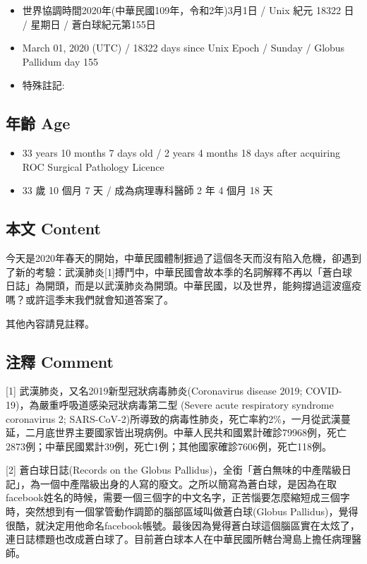 \documentclass[a5paper, 12pt
]{book}
\providecommand{\tightlist}{%
  \setlength{\itemsep}{0pt}\setlength{\parskip}{0pt}}
\begin{document}
\begin{itemize}
\tightlist
\item
  世界協調時間2020年(中華民國109年，令和2年)3月1日 / Unix 紀元 18322 日
  / 星期日 / 蒼白球紀元第155日
\item
  March 01, 2020 (UTC) / 18322 days since Unix Epoch / Sunday / Globus
  Pallidum day 155
\item
  特殊註記:
\end{itemize}

\hypertarget{ux5e74ux9f61-age}{%
\subsection{年齡 Age}\label{ux5e74ux9f61-age}}

\begin{itemize}
\tightlist
\item
  33 years 10 months 7 days old / 2 years 4 months 18 days after
  acquiring ROC Surgical Pathology Licence
\item
  33 歲 10 個月 7 天 / 成為病理專科醫師 2 年 4 個月 18 天
\end{itemize}

\hypertarget{ux672cux6587-content}{%
\subsection{本文 Content}\label{ux672cux6587-content}}

今天是2020年春天的開始，中華民國體制捱過了這個冬天而沒有陷入危機，卻遇到了新的考驗：武漢肺炎{[}1{]}搏鬥中，中華民國會故本季的名詞解釋不再以「蒼白球日誌」為開頭，而是以武漢肺炎為開頭。中華民國，以及世界，能夠撐過這波瘟疫嗎？或許這季末我們就會知道答案了。

其他內容請見註釋。

\hypertarget{ux6ce8ux91cb-comment}{%
\subsection{注釋 Comment}\label{ux6ce8ux91cb-comment}}

{[}1{]} 武漢肺炎，又名2019新型冠狀病毒肺炎(Coronavirus disease 2019;
COVID-19)，為嚴重呼吸道感染冠狀病毒第二型 (Severe acute respiratory
syndrome coronavirus 2;
SARS-CoV-2)所導致的病毒性肺炎，死亡率約2\%，一月從武漢蔓延，二月底世界主要國家皆出現病例。中華人民共和國累計確診79968例，死亡2873例；中華民國累計39例，死亡1例；其他國家確診7606例，死亡118例。

{[}2{]} 蒼白球日誌(Records on the Globus
Pallidus)，全銜「蒼白無味的中產階級日記」，為一個中產階級出身的人寫的廢文。之所以簡寫為蒼白球，是因為在取facebook姓名的時候，需要一個三個字的中文名字，正苦惱要怎麼縮短成三個字時，突然想到有一個掌管動作調節的腦部區域叫做蒼白球(Globus
Pallidus)，覺得很酷，就決定用他命名facebook帳號。最後因為覺得蒼白球這個腦區實在太炫了，連日誌標題也改成蒼白球了。目前蒼白球本人在中華民國所轄台灣島上擔任病理醫師。
\end{document}
